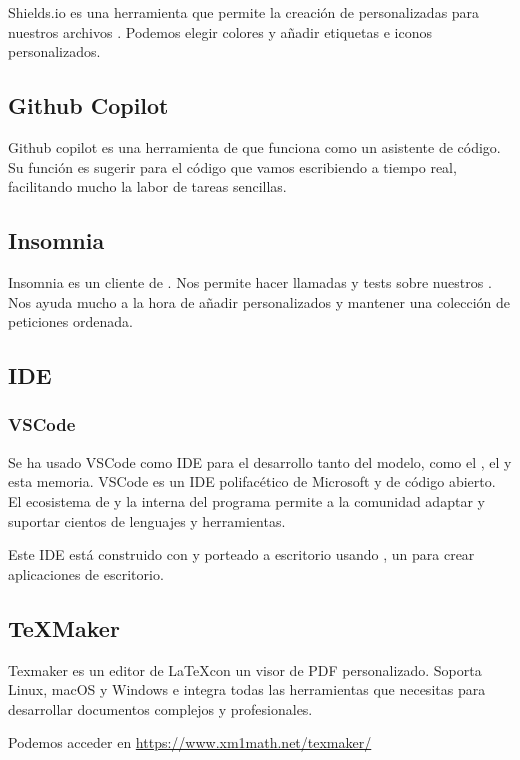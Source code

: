 Shields.io es una herramienta que permite la creación de  personalizadas para nuestros archivos . Podemos elegir colores y añadir etiquetas e iconos personalizados.

\subsection{Github Copilot}

Github copilot es una herramienta de  que funciona como un asistente de código. Su función es sugerir  para el código que vamos escribiendo a tiempo real, facilitando mucho la labor de tareas sencillas.

\subsection{Insomnia}

Insomnia es un cliente de . Nos permite hacer llamadas y tests sobre nuestros . Nos ayuda mucho a la hora de añadir  personalizados y mantener una colección de peticiones ordenada.

\subsection{IDE}

\subsubsection{VSCode}

Se ha usado VSCode como IDE para el desarrollo tanto del modelo, como el , el  y esta memoria. VSCode es un IDE polifacético de Microsoft y de código abierto. El ecosistema de  y la  interna del programa permite a la comunidad adaptar y suportar cientos de lenguajes y herramientas.

Este IDE está construido con  y porteado a escritorio usando , un  para crear aplicaciones de escritorio.

\subsection{\TeX Maker}

Texmaker es un editor de \LaTeX con un visor de PDF personalizado. Soporta Linux, macOS y Windows e integra todas las herramientas que necesitas para desarrollar documentos complejos y profesionales.

Podemos acceder en \url{https://www.xm1math.net/texmaker/}

